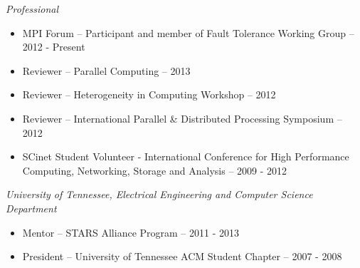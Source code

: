{\sl Professional}
\begin{itemize}
    \item MPI Forum -- Participant and member of Fault Tolerance Working Group -- 2012 - Present
    \item Reviewer -- Parallel Computing -- 2013
    \item Reviewer -- Heterogeneity in Computing Workshop -- 2012
    \item Reviewer -- International Parallel \& Distributed Processing Symposium -- 2012
    \item SCinet Student Volunteer - International Conference for High Performance Computing, Networking, Storage and Analysis -- 2009 - 2012
\end{itemize}

{\sl University of Tennessee, Electrical Engineering and Computer Science Department}
\begin{itemize}
    \item Mentor -- STARS Alliance Program -- 2011 - 2013
    \item President -- University of Tennessee ACM Student Chapter -- 2007 - 2008
\end{itemize}
